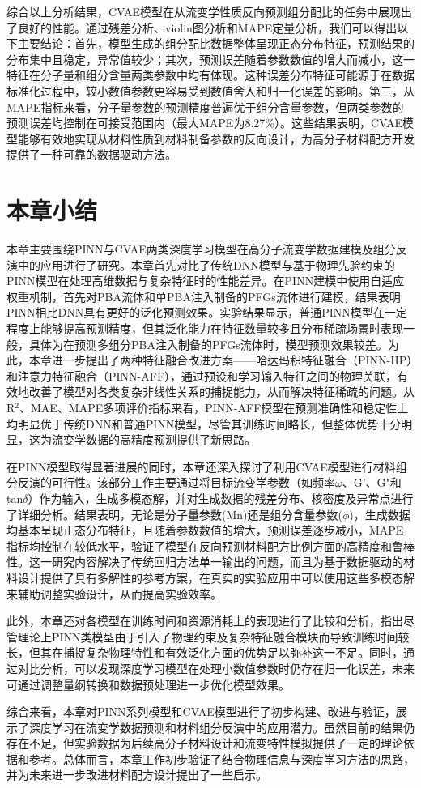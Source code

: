 综合以上分析结果，CVAE模型在从流变学性质反向预测组分配比的任务中展现出了良好的性能。通过残差分析、violin图分析和MAPE定量分析，我们可以得出以下主要结论：首先，模型生成的组分配比数据整体呈现正态分布特征，预测结果的分布集中且稳定，异常值较少；其次，预测误差随着参数数值的增大而减小，这一特征在分子量和组分含量两类参数中均有体现。这种误差分布特征可能源于在数据标准化过程中，较小数值参数更容易受到数值舍入和归一化误差的影响。第三，从MAPE指标来看，分子量参数的预测精度普遍优于组分含量参数，但两类参数的预测误差均控制在可接受范围内（最大MAPE为8.27\%）。这些结果表明，CVAE模型能够有效地实现从材料性质到材料制备参数的反向设计，为高分子材料配方开发提供了一种可靠的数据驱动方法。

\section{本章小结}
本章主要围绕PINN与CVAE两类深度学习模型在高分子流变学数据建模及组分反演中的应用进行了研究。本章首先对比了传统DNN模型与基于物理先验约束的PINN模型在处理高维数据与复杂特征时的性能差异。在PINN建模中使用自适应权重机制，首先对PBA流体和单PBA注入制备的PFGs流体进行建模，结果表明PINN相比DNN具有更好的泛化预测效果。实验结果显示，普通PINN模型在一定程度上能够提高预测精度，但其泛化能力在特征数量较多且分布稀疏场景时表现一般，具体为在预测多组分PBA注入制备的PFGs流体时，模型预测效果较差。为此，本章进一步提出了两种特征融合改进方案——哈达玛积特征融合（PINN-HP）和注意力特征融合（PINN-AFF），通过预设和学习输入特征之间的物理关联，有效地改善了模型对各类复杂非线性关系的捕捉能力，从而解决特征稀疏的问题。从R$^2$、MAE、MAPE多项评价指标来看，PINN-AFF模型在预测准确性和稳定性上均明显优于传统DNN和普通PINN模型，尽管其训练时间略长，但整体优势十分明显，这为流变学数据的高精度预测提供了新思路。

在PINN模型取得显著进展的同时，本章还深入探讨了利用CVAE模型进行材料组分反演的可行性。该部分工作主要通过将目标流变学参数（如频率$\omega$、G'、G"和tan$\delta$）作为输入，生成多模态解，并对生成数据的残差分布、核密度及异常点进行了详细分析。结果表明，无论是分子量参数(Mn)还是组分含量参数($\phi$)，生成数据均基本呈现正态分布特征，且随着参数数值的增大，预测误差逐步减小，MAPE指标均控制在较低水平，验证了模型在反向预测材料配方比例方面的高精度和鲁棒性。这一研究内容解决了传统回归方法单一输出的问题，而且为基于数据驱动的材料设计提供了具有多解性的参考方案，在真实的实验应用中可以使用这些多模态解来辅助调整实验设计，从而提高实验效率。

此外，本章还对各模型在训练时间和资源消耗上的表现进行了比较和分析，指出尽管理论上PINN类模型由于引入了物理约束及复杂特征融合模块而导致训练时间较长，但其在捕捉复杂物理特性和有效泛化方面的优势足以弥补这一不足。同时，通过对比分析，可以发现深度学习模型在处理小数值参数时仍存在归一化误差，未来可通过调整量纲转换和数据预处理进一步优化模型效果。

综合来看，本章对PINN系列模型和CVAE模型进行了初步构建、改进与验证，展示了深度学习在流变学数据预测和材料组分反演中的应用潜力。虽然目前的结果仍存在不足，但实验数据为后续高分子材料设计和流变特性模拟提供了一定的理论依据和参考。总体而言，本章工作初步验证了结合物理信息与深度学习方法的思路，并为未来进一步改进材料配方设计提出了一些启示。
